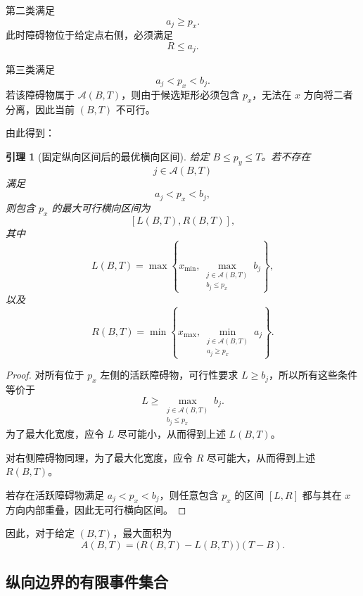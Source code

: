 \documentclass[UTF8,12pt,a4paper]{ctexart}
\newtheorem{lemma}{引理}
\begin{document}
第二类满足
\begin{equation}
    a_j\ge p_x.
\end{equation}
此时障碍物位于给定点右侧，必须满足
\begin{equation}
    R\le a_j.
\end{equation}

第三类满足
\begin{equation}
    a_j<p_x<b_j.
\end{equation}
若该障碍物属于 $\mathcal A(B,T)$，则由于候选矩形必须包含 $p_x$，无法在 $x$ 方向将二者分离，因此当前 $(B,T)$ 不可行。

由此得到：

\begin{lemma}[固定纵向区间后的最优横向区间]
给定 $B\le p_y\le T$。若不存在
\[
j\in\mathcal A(B,T)
\]
满足
\[
a_j<p_x<b_j,
\]
则包含 $p_x$ 的最大可行横向区间为
\[
[L(B,T),R(B,T)],
\]
其中
\begin{equation}
\boxed{
L(B,T)
=
\max\left\{
x_{\min},
\max_{\substack{
j\in\mathcal A(B,T)\\
b_j\le p_x}}
b_j
\right\},
}
\end{equation}
以及
\begin{equation}
\boxed{
R(B,T)
=
\min\left\{
x_{\max},
\min_{\substack{
j\in\mathcal A(B,T)\\
a_j\ge p_x}}
a_j
\right\}.
}
\end{equation}
\end{lemma}

\begin{proof}
对所有位于 $p_x$ 左侧的活跃障碍物，可行性要求 $L\ge b_j$，所以所有这些条件等价于
\[
L
\ge
\max_{\substack{
j\in\mathcal A(B,T)\\
b_j\le p_x}}
b_j.
\]
为了最大化宽度，应令 $L$ 尽可能小，从而得到上述 $L(B,T)$。

对右侧障碍物同理，为了最大化宽度，应令 $R$ 尽可能大，从而得到上述 $R(B,T)$。

若存在活跃障碍物满足 $a_j<p_x<b_j$，则任意包含 $p_x$ 的区间 $[L,R]$ 都与其在 $x$ 方向内部重叠，因此无可行横向区间。
\end{proof}

因此，对于给定 $(B,T)$，最大面积为
\begin{equation}
    A(B,T)
    =
    \bigl(R(B,T)-L(B,T)\bigr)(T-B).
\end{equation}

\subsection{纵向边界的有限事件集合}
\end{document}
